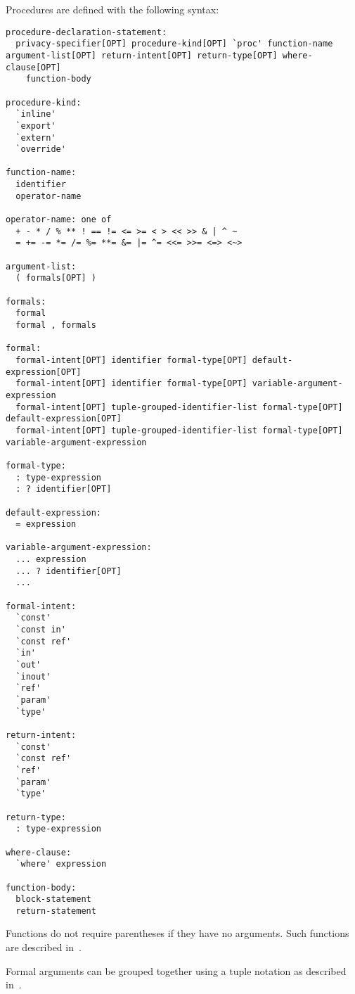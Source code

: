 Procedures are defined with the following syntax:
\begin{syntax}
\begin{verbatim}
procedure-declaration-statement:
  privacy-specifier[OPT] procedure-kind[OPT] `proc' function-name argument-list[OPT] return-intent[OPT] return-type[OPT] where-clause[OPT]
    function-body

procedure-kind:
  `inline'
  `export'
  `extern'
  `override'

function-name:
  identifier
  operator-name

operator-name: one of
  + - * / % ** ! == != <= >= < > << >> & | ^ ~
  = += -= *= /= %= **= &= |= ^= <<= >>= <=> <~>

argument-list:
  ( formals[OPT] )

formals:
  formal
  formal , formals

formal:
  formal-intent[OPT] identifier formal-type[OPT] default-expression[OPT]
  formal-intent[OPT] identifier formal-type[OPT] variable-argument-expression
  formal-intent[OPT] tuple-grouped-identifier-list formal-type[OPT] default-expression[OPT]
  formal-intent[OPT] tuple-grouped-identifier-list formal-type[OPT] variable-argument-expression

formal-type:
  : type-expression
  : ? identifier[OPT]

default-expression:
  = expression

variable-argument-expression:
  ... expression
  ... ? identifier[OPT]
  ...

formal-intent:
  `const'
  `const in'
  `const ref'
  `in'
  `out'
  `inout'
  `ref'
  `param'
  `type'

return-intent:
  `const'
  `const ref'
  `ref'
  `param'
  `type'

return-type:
  : type-expression

where-clause:
  `where' expression

function-body:
  block-statement
  return-statement
\end{verbatim}
\end{syntax}


Functions do not require parentheses if they have no arguments.  Such
functions are described in~.

Formal arguments can be grouped together using a tuple notation as
described in~.

